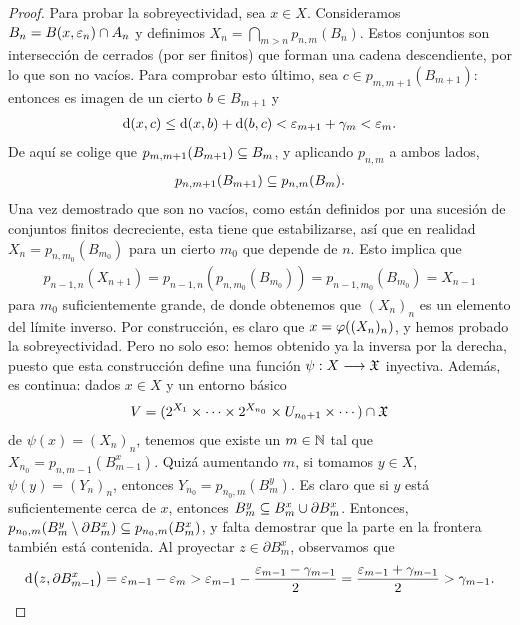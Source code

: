\begin{proof}
  Para probar la sobreyectividad, sea $ x\in X  $. Consideramos $ B_n = B(x,\varepsilon_n)\cap A_n  $ y definimos $ X_n = \bigcap_{m>n }p_{n,m}(B_n) $. Estos conjuntos son intersección de cerrados (por ser finitos) que forman una cadena descendiente, por lo que son no vacíos. Para comprobar esto último, sea $ c \in p_{m,m+1}(B_{m+1}) $: entonces es imagen de un cierto $ b \in B_{m+1 } $ y  
  \begin{gather*}
    \dd(x,c)\leq \dd(x,b)+\dd(b,c)<\varepsilon_{m+1}+\gamma_m <\varepsilon_m .
  \end{gather*}
  De aquí se colige que $ p_{m,m+1}(B_{m+1})\subseteq B_m  $, y aplicando $ p_{n,m } $ a ambos lados, 
  \begin{gather*}
      p_{n,m+1}(B_{m+1})\subseteq p_{n,m}(B_m). 
  \end{gather*} 
  Una vez demostrado que son no vacíos, como están definidos por una sucesión de conjuntos finitos decreciente, esta tiene que estabilizarse, así que en realidad $ X_{n} = p_{n,m_0}(B_{m_0 }) $ para un cierto $ m_0  $ que depende de $ n  $. Esto implica que 
  \begin{gather*}
    p_{n-1,n}(X_{n+1}) = p_{n-1,n}(p_{n,m_0}(B_{m_0})) = p_{n-1,m_0}(B_{m_0}) = X_{n-1}
  \end{gather*}
  para $ m_0  $ suficientemente grande, de donde obtenemos que $ (X_n )_n$ es un elemento del límite inverso. Por construcción, es claro que $ x = \varphi((X_n )_n) $, y hemos probado la sobreyectividad. Pero no solo eso: hemos obtenido ya la inversa por la derecha, puesto que esta construcción define una función $ \psi:X\longrightarrow \mathfrak{X}  $ inyectiva. Además, es continua: dados $ x\in X  $ y un entorno básico 
  \begin{gather*}
    V = (2^{X_1}\times\cdots\times 2^{X_{n_0}}\times U_{n_0+1}\times\cdots)\cap\mathfrak{X} 
  \end{gather*}
  de $ \psi(x )  = (X_n )_n$, tenemos que existe un $m\in \mathbb{N} $ tal que $ X_{n_0} = p_{n,m-1}(B^x_{m-1}) $. Quizá aumentando $ m  $, si tomamos $ y\in X  $, $ \psi(y) = (Y_n)_n $, entonces $ Y_{n_0} = p_{n_0,m}(B^y_{m}) $. Es claro que si $ y  $ está suficientemente cerca de $ x  $, entonces $ B^y_m \subseteq  B^x_m \cup \partial B^x_m   $. Entonces, $ p_{n_0,m}(B^y_m\setminus \partial B_m^x)\subseteq p_{n_0,m}(B^x_m ) $, y falta demostrar que la parte en la frontera también está contenida. Al proyectar $ z\in \partial B_m^x  $, observamos que 
  \begin{gather*}
    \dd (z,\partial B^x_{m-1}) = \eps_{m-1} - \eps_m > \eps_{m-1} - \frac{\eps_{m-1}-\gamma_{m-1}}{2} = \frac{\eps_{m-1}+\gamma_{m-1 }}{2}>\gamma_{m-1 }.

\end{gather*}
\end{proof}
